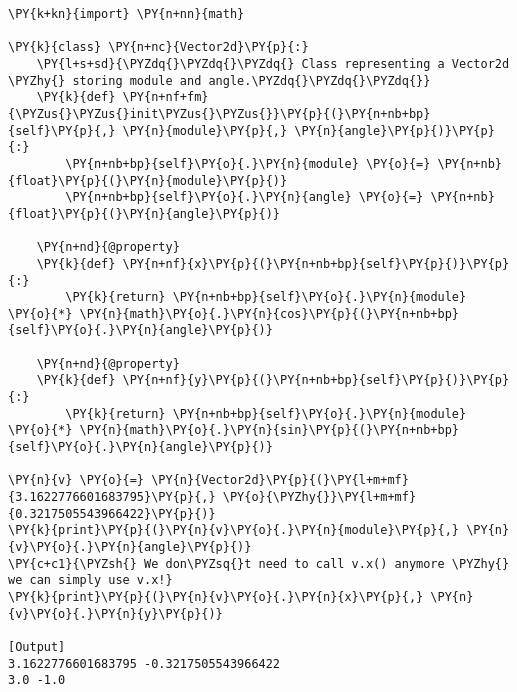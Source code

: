 \begin{Verbatim}[label=\makebox{\url{https://github.com/lucabaldini/cmepda/tree/master/slides/latex/snippets/vector2d\_property.py}},commandchars=\\\{\}]
\PY{k+kn}{import} \PY{n+nn}{math}

\PY{k}{class} \PY{n+nc}{Vector2d}\PY{p}{:}
    \PY{l+s+sd}{\PYZdq{}\PYZdq{}\PYZdq{} Class representing a Vector2d \PYZhy{} storing module and angle.\PYZdq{}\PYZdq{}\PYZdq{}}   
    \PY{k}{def} \PY{n+nf+fm}{\PYZus{}\PYZus{}init\PYZus{}\PYZus{}}\PY{p}{(}\PY{n+nb+bp}{self}\PY{p}{,} \PY{n}{module}\PY{p}{,} \PY{n}{angle}\PY{p}{)}\PY{p}{:}
        \PY{n+nb+bp}{self}\PY{o}{.}\PY{n}{module} \PY{o}{=} \PY{n+nb}{float}\PY{p}{(}\PY{n}{module}\PY{p}{)}
        \PY{n+nb+bp}{self}\PY{o}{.}\PY{n}{angle} \PY{o}{=} \PY{n+nb}{float}\PY{p}{(}\PY{n}{angle}\PY{p}{)}
   
    \PY{n+nd}{@property}
    \PY{k}{def} \PY{n+nf}{x}\PY{p}{(}\PY{n+nb+bp}{self}\PY{p}{)}\PY{p}{:}
        \PY{k}{return} \PY{n+nb+bp}{self}\PY{o}{.}\PY{n}{module} \PY{o}{*} \PY{n}{math}\PY{o}{.}\PY{n}{cos}\PY{p}{(}\PY{n+nb+bp}{self}\PY{o}{.}\PY{n}{angle}\PY{p}{)}
    
    \PY{n+nd}{@property}
    \PY{k}{def} \PY{n+nf}{y}\PY{p}{(}\PY{n+nb+bp}{self}\PY{p}{)}\PY{p}{:}
        \PY{k}{return} \PY{n+nb+bp}{self}\PY{o}{.}\PY{n}{module} \PY{o}{*} \PY{n}{math}\PY{o}{.}\PY{n}{sin}\PY{p}{(}\PY{n+nb+bp}{self}\PY{o}{.}\PY{n}{angle}\PY{p}{)}
  
\PY{n}{v} \PY{o}{=} \PY{n}{Vector2d}\PY{p}{(}\PY{l+m+mf}{3.1622776601683795}\PY{p}{,} \PY{o}{\PYZhy{}}\PY{l+m+mf}{0.3217505543966422}\PY{p}{)}
\PY{k}{print}\PY{p}{(}\PY{n}{v}\PY{o}{.}\PY{n}{module}\PY{p}{,} \PY{n}{v}\PY{o}{.}\PY{n}{angle}\PY{p}{)}
\PY{c+c1}{\PYZsh{} We don\PYZsq{}t need to call v.x() anymore \PYZhy{} we can simply use v.x!}
\PY{k}{print}\PY{p}{(}\PY{n}{v}\PY{o}{.}\PY{n}{x}\PY{p}{,} \PY{n}{v}\PY{o}{.}\PY{n}{y}\PY{p}{)}

[Output]
3.1622776601683795 -0.3217505543966422
3.0 -1.0
\end{Verbatim}